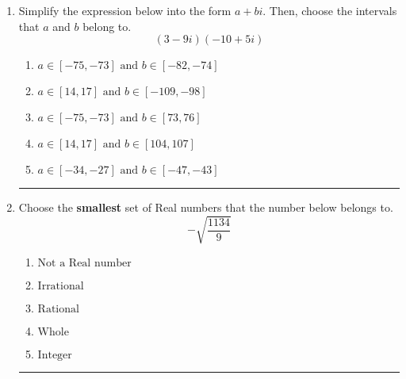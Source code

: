 \documentclass[14pt]{extbook}
\newcommand{\litem}[1]{\item#1\hspace*{-1cm}\rule{\textwidth}{0.4pt}}
\begin{document}
\begin{enumerate}
{\begin{enumerate}[label=\Alph*.]
\end{enumerate} }
\litem{
Simplify the expression below into the form $a+bi$. Then, choose the intervals that $a$ and $b$ belong to.\[ (3 - 9 i)(-10 + 5 i) \]\begin{enumerate}[label=\Alph*.]
\item \( a \in [-75, -73] \text{ and } b \in [-82, -74] \)
\item \( a \in [14, 17] \text{ and } b \in [-109, -98] \)
\item \( a \in [-75, -73] \text{ and } b \in [73, 76] \)
\item \( a \in [14, 17] \text{ and } b \in [104, 107] \)
\item \( a \in [-34, -27] \text{ and } b \in [-47, -43] \)

\end{enumerate} }
\litem{
Choose the \textbf{smallest} set of Real numbers that the number below belongs to.\[ -\sqrt{\frac{1134}{9}} \]\begin{enumerate}[label=\Alph*.]
\item \( \text{Not a Real number} \)
\item \( \text{Irrational} \)
\item \( \text{Rational} \)
\item \( \text{Whole} \)
\item \( \text{Integer} \)

\end{enumerate} }
\end{enumerate}
\end{document}
